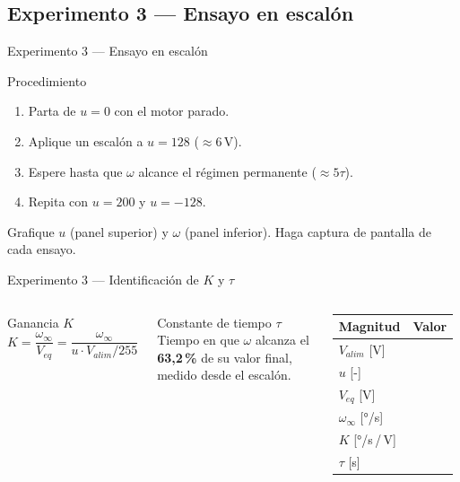 \documentclass{beamer}
\begin{document}
\subsection{Experimento 3 --- Ensayo en escalón}

\begin{frame}{Experimento 3 --- Ensayo en escalón}
\begin{block}{Procedimiento}
  \begin{enumerate}
    \item Parta de $u = 0$ con el motor parado.
    \item Aplique un escalón a $u = 128$ ($\approx 6$\,V).
    \item Espere hasta que $\omega$ alcance el régimen permanente ($\approx 5\tau$).
    \item Repita con $u = 200$ y $u = -128$.
  \end{enumerate}
\end{block}
Grafique $u$ (panel superior) y $\omega$ (panel inferior).
Haga captura de pantalla de cada ensayo.
\end{frame}

\begin{frame}{Experimento 3 --- Identificación de $K$ y $\tau$}
\begin{columns}[T]
  \begin{block}{Ganancia $K$}
    \[ K = \frac{\omega_\infty}{V_{eq}} = \frac{\omega_\infty}{u \cdot V_{alim}/255} \]
  \end{block}
  \vspace{4pt}
  \begin{block}{Constante de tiempo $\tau$}
    Tiempo en que $\omega$ alcanza el \textbf{63,2\,\%}
    de su valor final, medido desde el escalón.
  \end{block}
  \begin{tabular}{|l|c|}
    \hline
    \textbf{Magnitud} & \textbf{Valor} \\ \hline
    $V_{alim}$ [V] & \\
    $u$ [-] & \\ $V_{eq}$ [V] & \\
    $\omega_\infty$ [°/s] & \\
    $K$ [°/s\,/\,V] & \\ $\tau$ [s] & \\ \hline
  \end{tabular}
\end{columns}
\end{frame}
\end{document}
